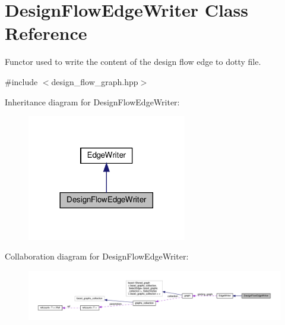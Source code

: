 \hypertarget{classDesignFlowEdgeWriter}{}\section{Design\+Flow\+Edge\+Writer Class Reference}
\label{classDesignFlowEdgeWriter}


Functor used to write the content of the design flow edge to dotty file.  




{\ttfamily \#include $<$design\+\_\+flow\+\_\+graph.\+hpp$>$}



Inheritance diagram for Design\+Flow\+Edge\+Writer\+:
\nopagebreak
\begin{figure}[H]
\begin{center}
\leavevmode
\includegraphics[width=197pt]{d1/da8/classDesignFlowEdgeWriter__inherit__graph}
\end{center}
\end{figure}


Collaboration diagram for Design\+Flow\+Edge\+Writer\+:
\nopagebreak
\begin{figure}[H]
\begin{center}
\leavevmode
\includegraphics[width=350pt]{df/d1e/classDesignFlowEdgeWriter__coll__graph}
\end{center}
\end{figure}
